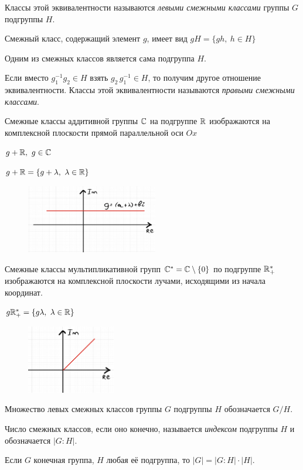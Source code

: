 \begin{definition}
  Классы этой эквивалентности называются \textit{левыми смежными классами} группы $G$ подгруппы $H$.

  Смежный класс, содержащий элемент $g$, имеет вид $gH = \{gh,~h \in H\}$
\end{definition}

Одним из смежных классов является сама подгруппа $H$.

Если вместо $g_1^{-1}g_2\in H$ взять $g_2\,g_1^{-1}\in H$, то получим другое отношение эквивалентности. Классы этой эквивалентности называются \textit{правыми смежными классами}.
\begin{example}
  Смежные классы аддитивной группы $\mathbb{C}$ на подгруппе $\mathbb{R}$ изображаются на комплексной плоскости прямой параллельной оси $Ox$

  $g + \mathbb{R},~g\in \mathbb{C}$

  $g + \mathbb{R} = \{g + \lambda,~\lambda \in \mathbb{R}\}$
  \begin{figure}[H]
    \centering
    \includegraphics[height = 3cm]{images/groups_complex_example.png}
  \end{figure}
\end{example}
\begin{example}
  Смежные классы мультипликативной групп $\mathbb{C}^\ast = \mathbb{C} \setminus \{0\}$ по подгруппе $\mathbb{R}^\ast_+$ изображаются на комплексной плоскости лучами, исходящими из начала координат.

  $g\mathbb{R}^\ast_+ = \{g\lambda,~\lambda \in \mathbb{R}\}$
  \begin{figure}[H]
    \centering
    \includegraphics[height = 3cm]{images/groups_complex_withoutZero.png}
  \end{figure}
\end{example}

Множество левых смежных классов группы $G$ подгруппы $H$ обозначается $G/H$.
\begin{definition}
  Число смежных классов, если оно конечно, называется \textit{индексом} подгруппы $H$ и обозначается $\mathopen|G:H\mathclose|$.
\end{definition}
\begin{theorem}[Лагранжа]
  Если $G$ конечная группа, $H$ любая её подгруппа, то $\mathopen|G\mathclose| = \mathopen|G:H\mathclose| \cdot \mathopen|H\mathclose|$.
\end{theorem}

